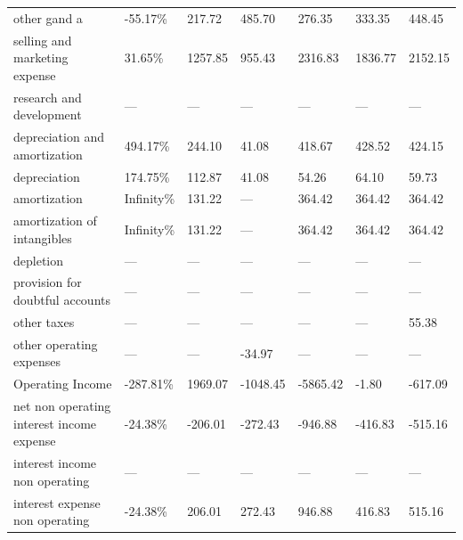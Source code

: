 \begin{table}[]
{\begin{tabular}{@{}lllllll@{}}
other gand a                                                  & -55.17\%   & 217.72    & 485.70    & 276.35   & 333.35   & 448.45   \\
selling and marketing expense                                 & 31.65\%    & 1257.85   & 955.43    & 2316.83  & 1836.77  & 2152.15  \\
research and development                                      & —          & —         & —         & —        & —        & —        \\
depreciation and amortization                                 & 494.17\%   & 244.10    & 41.08     & 418.67   & 428.52   & 424.15   \\
depreciation                                                  & 174.75\%   & 112.87    & 41.08     & 54.26    & 64.10    & 59.73    \\
amortization                                                  & Infinity\% & 131.22    & —         & 364.42   & 364.42   & 364.42   \\
amortization of intangibles                                   & Infinity\% & 131.22    & —         & 364.42   & 364.42   & 364.42   \\
depletion                                                     & —          & —         & —         & —        & —        & —        \\
provision for doubtful accounts                               & —          & —         & —         & —        & —        & —        \\
other taxes                                                   & —          & —         & —         & —        & —        & 55.38    \\
other operating expenses                                      & —          & —         & -34.97    & —        & —        & —        \\
Operating Income                                              & -287.81\%  & 1969.07   & -1048.45  & -5865.42 & -1.80    & -617.09  \\
net non operating interest income expense                     & -24.38\%   & -206.01   & -272.43   & -946.88  & -416.83  & -515.16  \\
interest income non operating                                 & —          & —         & —         & —        & —        & —        \\
interest expense non operating                                & -24.38\%   & 206.01    & 272.43    & 946.88   & 416.83   & 515.16   \\

\end{tabular}}
\end{table}
